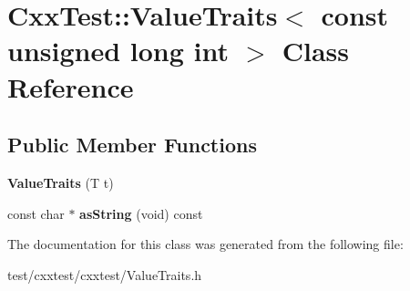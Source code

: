 \hypertarget{classCxxTest_1_1ValueTraits_3_01const_01unsigned_01long_01int_01_4}{\section{Cxx\-Test\-:\-:Value\-Traits$<$ const unsigned long int $>$ Class Reference}
\label{classCxxTest_1_1ValueTraits_3_01const_01unsigned_01long_01int_01_4}
}
\subsection*{Public Member Functions}
\begin{DoxyCompactItemize}
\item 
\hypertarget{classCxxTest_1_1ValueTraits_3_01const_01unsigned_01long_01int_01_4_a1bdab0f349d92d078f5aa24a133f4307}{{\bfseries Value\-Traits} (T t)}\label{classCxxTest_1_1ValueTraits_3_01const_01unsigned_01long_01int_01_4_a1bdab0f349d92d078f5aa24a133f4307}

\item 
\hypertarget{classCxxTest_1_1ValueTraits_3_01const_01unsigned_01long_01int_01_4_adf3b969d89db1885a6e4e8ed197d8fc3}{const char $\ast$ {\bfseries as\-String} (void) const }\label{classCxxTest_1_1ValueTraits_3_01const_01unsigned_01long_01int_01_4_adf3b969d89db1885a6e4e8ed197d8fc3}

\end{DoxyCompactItemize}


The documentation for this class was generated from the following file\-:\begin{DoxyCompactItemize}
\item 
test/cxxtest/cxxtest/Value\-Traits.\-h\end{DoxyCompactItemize}
